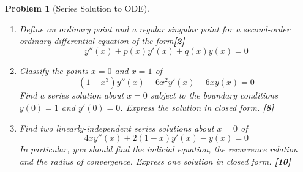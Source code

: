 \documentclass[a4paper]{article}
\theoremstyle{new}
\newtheorem{qns}{Problem}[section]
\begin{document}
\newpage
\begin{qns}[Series Solution to ODE]\leavevmode
\begin{enumerate}[label=(\alph*)]
\item Define an ordinary point and a regular singular point for a second-order ordinary differential equation of the form\hfill\textbf{[2]}
$$y''(x)+p(x)y'(x)+q(x)y(x)=0$$
\item Classify the points $x = 0$ and $x = 1$ of
$$(1 − x^3)y''(x) − 6x^2y'(x) − 6xy(x) = 0$$
Find a series solution about $x = 0$ subject to the boundary conditions $y(0) = 1$ and $y'(0) = 0$. Express the solution in closed form. \hfill\textbf{[8]}
\item Find two linearly-independent series solutions about $x = 0$ of
$$4xy''(x)+2(1-x)y'(x)-y(x)=0$$
In particular, you should find the indicial equation, the recurrence relation and the radius of convergence. Express one solution in closed form. \hfill\textbf{[10]}
\end{enumerate}
\end{qns}
\end{document}

